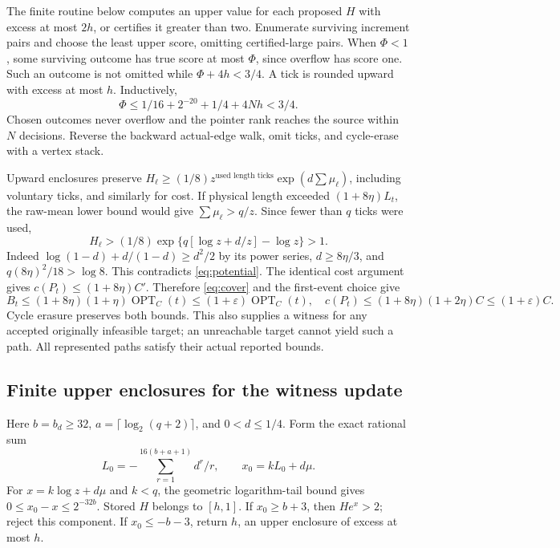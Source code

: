 \documentclass[acmsmall,11pt,screen,nonacm]{acmart}
\newcommand{\OPT}{\operatorname{OPT}}
\begin{document}
The finite routine below computes an upper value for each proposed $H$ with excess at most $2h$, or certifies it greater than two. Enumerate surviving increment pairs and choose the least upper score, omitting certified-large pairs. When $\Phi<1$, some surviving outcome has true score at most $\Phi$, since overflow has score one. Such an outcome is not omitted while $\Phi+4h<3/4$. A tick is rounded upward with excess at most $h$. Inductively,
\begin{equation}\label{eq:potential}
 \Phi\le1/16+2^{-20}+1/4+4Nh<3/4.
\end{equation}
Chosen outcomes never overflow and the pointer rank reaches the source within $N$ decisions. Reverse the backward actual-edge walk, omit ticks, and cycle-erase with a vertex stack.

Upward enclosures preserve
$H_\ell\ge(1/8)z^{\text{used length ticks}}\exp(d\sum\mu_\ell)$,
including voluntary ticks, and similarly for cost. If physical length exceeded $(1+8\eta)L_t$, the raw-mean lower bound would give $\sum\mu_\ell>q/z$. Since fewer than $q$ ticks were used,
\[
 H_\ell>(1/8)\exp\{q[\log z+d/z]-\log z\}>1.
\]
Indeed $\log(1-d)+d/(1-d)\ge d^2/2$ by its power series, $d\ge8\eta/3$, and $q(8\eta)^2/18>\log8$. This contradicts \eqref{eq:potential}. The identical cost argument gives $c(P_t)\le(1+8\eta)C'$. Therefore \eqref{eq:cover} and the first-event choice give
\[
 B_t\le(1+8\eta)(1+\eta)\OPT_C(t)\le(1+\varepsilon)\OPT_C(t),
 \quad c(P_t)\le(1+8\eta)(1+2\eta)C\le(1+\varepsilon)C.
\]
Cycle erasure preserves both bounds. This also supplies a witness for any accepted originally infeasible target; an unreachable target cannot yield such a path. All represented paths satisfy their actual reported bounds.

\subsection{Finite upper enclosures for the witness update}\label{sec:exp}
Here $b=b_d\ge32$, $a=\lceil\log_2(q+2)\rceil$, and $0<d\le1/4$. Form the exact rational sum
\[
 L_0=-\sum_{r=1}^{16(b+a+1)}d^r/r,\qquad x_0=kL_0+d\mu.
\]
For $x=k\log z+d\mu$ and $k<q$, the geometric logarithm-tail bound gives $0\le x_0-x\le2^{-32b}$. Stored $H$ belongs to $[h,1]$. If $x_0\ge b+3$, then $He^x>2$; reject this component. If $x_0\le-b-3$, return $h$, an upper enclosure of excess at most $h$.
\end{document}
